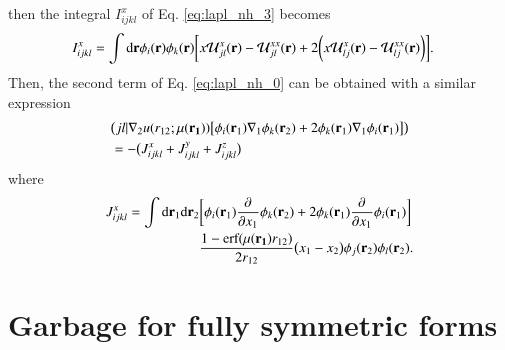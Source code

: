 \documentclass[aip,jcp,reprint,noshowkeys,superscriptaddress]{revtex4-1}
\newcommand{\deriv}[3]{\frac{\partial^{#3} #1}{\partial {#2}^{#3}}}
\newcommand{\br}[0]{{\bf {r}}}
\newcommand{\mur}[1]{\mu({\bf r_{#1}})}
\begin{document}
then the integral $I_{ijkl}^x $ of Eq. \eqref{eq:lapl_nh_3} becomes 
\begin{equation}
 \label{eq:lapl_nh_1}
 \begin{aligned}
 &I_{ijkl}^x = \int \text{d}\br \phi_i(\br) \phi_k(\br) \bigg[ x \mathcal{U}_{jl}^x(\br) - \mathcal{U}_{jl}^{xx}(\br) + 2 \bigg(x \mathcal{U}_{lj}^x(\br) - \mathcal{U}_{lj}^{xx}(\br) \bigg)\bigg].
 \end{aligned}
\end{equation}
Then, the second term of Eq. \eqref{eq:lapl_nh_0} can be obtained with a similar expression
\begin{equation}
 \begin{aligned}
 & \big(jl|\nabla_2u(r_{12};\mur{1}) \big[ \phi_i(\br_1)\nabla_1 \phi_k(\br_2) + 2 \phi_k(\br_1) \nabla_1 \phi_i(\br_1)\big] \big) \\
 &=-\big( J_{ijkl}^x + J_{ijkl}^y + J_{ijkl}^z \big)
 \end{aligned}
\end{equation}
where 
\begin{equation}
 \begin{aligned}
  J_{ijkl}^x = \int \text{d}\br_1 \text{d}\br_2 & \bigg[ \phi_i(\br_1)\deriv{}{x_1}{} \phi_k(\br_2) + 2 \phi_k(\br_1) \deriv{}{x_1}{} \phi_i(\br_1)\bigg] \\  
 & \frac{1 - \text{erf}(\mur{1} r_{12})}{2 r_{12}} \big(x_1 - x_2 \big) \phi_j(\br_2) \phi_l(\br_2).
 \end{aligned}
\end{equation}










\section{Garbage for fully symmetric forms}
\end{document}
